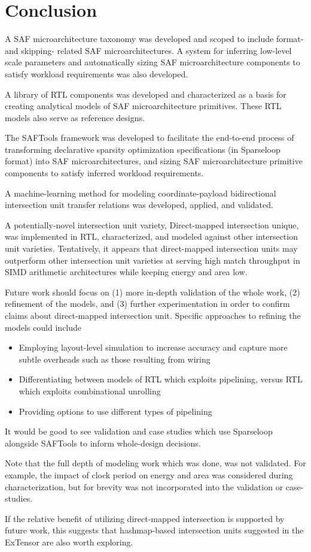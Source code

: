 \chapter{Conclusion}
\label{chapter:conclusion}

A SAF microarchitecture taxonomy was developed and scoped to include format- and skipping- related SAF microarchitectures. A system for inferring low-level scale parameters and automatically sizing SAF microarchitecture components to satisfy workload requirements was also developed.

A library of RTL components was developed and characterized as a basis for creating analytical models of SAF microarchitecture primitives. These RTL models also serve as reference designs.

The SAFTools framework was developed to facilitate the end-to-end process of transforming declarative sparsity optimization specifications (in Sparseloop\cite{sparseloop} format) into SAF microarchitectures, and sizing SAF microarchitecture primitive components to satisfy inferred workload requirements.

A machine-learning method for modeling coordinate-payload bidirectional intersection unit transfer relations was developed, applied, and validated.

A potentially-novel intersection unit variety, Direct-mapped intersection unique, was implemented in RTL, characterized, and modeled against other intersection unit varieties. Tentatively, it appears that direct-mapped intersection units may outperform other intersection unit varieties at serving high match throughput in SIMD arithmetic architectures while keeping energy and area low. 

Future work should focus on (1) more in-depth validation of the whole work, (2) refinement of the models, and (3) further experimentation in order to confirm claims about direct-mapped intersection unit. Specific approaches to refining the models could include

\begin{itemize}
    \item Employing layout-level simulation to increase accuracy and capture more subtle overheads such as those resulting from wiring
    \item Differentiating between models of RTL which exploits pipelining, versus RTL which exploits combinational unrolling
    \item Providing options to use different types of pipelining
\end{itemize}

It would be good to see validation and case studies which use Sparseloop alongside SAFTools to inform whole-design decisions.

Note that the full depth of modeling work which was done, was not validated. For example, the impact of clock period on energy and area was considered during characterization, but for brevity was not incorporated into the validation or case-studies.

If the relative benefit of utilizing direct-mapped intersection is supported by future work, this suggests that hashmap-based intersection units suggested in the ExTensor\cite{extensor} are also worth exploring.